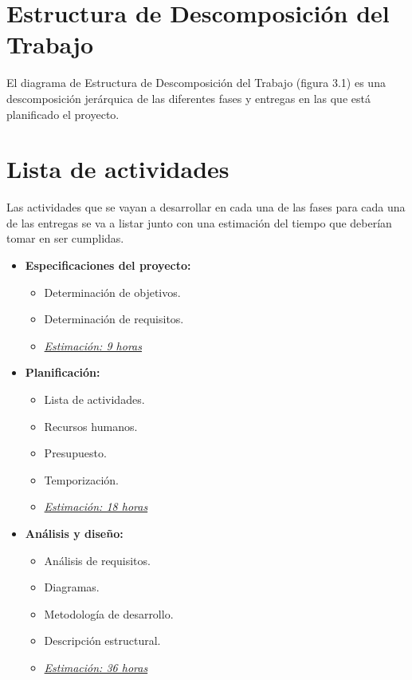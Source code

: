 \section{Estructura de Descomposición del Trabajo}

El diagrama de Estructura de Descomposición del Trabajo (figura 3.1) es una descomposición jerárquica de las diferentes fases y 
entregas en las que está planificado el proyecto.

\newpage
\section{Lista de actividades}

Las actividades que se vayan a desarrollar en cada una de las fases para cada una de las entregas se va a listar junto con una 
estimación del tiempo que deberían tomar en ser cumplidas.

\begin{itemize}
   \item \textbf{Especificaciones del proyecto:}
   \begin{itemize}
    \item Determinación de objetivos.
    \item Determinación de requisitos.
    \item \underline{\textit{Estimación: 9 horas}}
    \end{itemize}
\end{itemize}

\begin{itemize}
   \item \textbf{Planificación:}
   \begin{itemize}
    \item Lista de actividades.
    \item Recursos humanos.
    \item Presupuesto.
    \item Temporización.
    \item \underline{\textit{Estimación: 18 horas}}
   \end{itemize}
\end{itemize}

\begin{itemize}
   \item \textbf{Análisis y diseño:}
   \begin{itemize}
    \item Análisis de requisitos.
    \item Diagramas.
    \item Metodología de desarrollo.
    \item Descripción estructural.
    \item \underline{\textit{Estimación: 36 horas}}
   \end{itemize}
\end{itemize}

